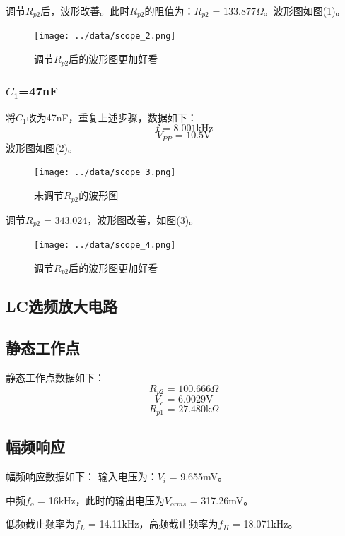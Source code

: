 \documentclass[a4paper]{article}
\begin{document}
调节$R_{p2}$后，波形改善。此时$R_{p2}$的阻值为：$R_{p2}\text{ = 133.877}\Omega$。波形图如图(\ref{datafig2})。
\begin{figure}[!h]
\centering
\texttt{[image: ../data/scope\_2.png]}\\
\caption{调节$R_{p2}$后的波形图更加好看}\label{datafig2}
\end{figure}

\subsubsection{$C_1$=47nF}
将$C_1$改为47nF，重复上述步骤，数据如下：
$$f\text{ = 8.001kHz}$$
$$V_{PP}\text{ = 10.5V}$$
波形图如图(\ref{datafig3})。
\begin{figure}[!h]
\centering
\texttt{[image: ../data/scope\_3.png]}\\
\caption{未调节$R_{p2}$的波形图}\label{datafig3}
\end{figure}

调节$R_{p2}\text{ = 343.024}$，波形图改善，如图(\ref{datafig4})。
\begin{figure}[!h]
\centering
\texttt{[image: ../data/scope\_4.png]}\\
\caption{调节$R_{p2}$后的波形图更加好看}\label{datafig4}
\end{figure}
\subsection{LC选频放大电路}
\subsection{静态工作点}
静态工作点数据如下：
$$R_{p2}\text{ = 100.666}\Omega$$
$$V_c\text{ = 6.0029V}$$
$$R_{p1}\text{ = 27.480k}\Omega$$
\subsection{幅频响应}
幅频响应数据如下：
输入电压为：$V_i$ = 9.655mV。

中频$f_o$ = 16kHz，此时的输出电压为$V_{orms}$ = 317.26mV。

低频截止频率为$f_L$ = 14.11kHz，高频截止频率为$f_H$ = 18.071kHz。
\end{document}
